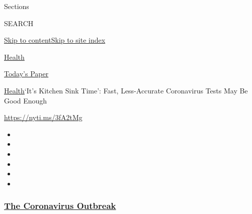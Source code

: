 Sections

SEARCH

\protect\hyperlink{site-content}{Skip to
content}\protect\hyperlink{site-index}{Skip to site index}

\href{https://www.nytimes3xbfgragh.onion/section/health}{Health}

\href{https://myaccount.nytimes3xbfgragh.onion/auth/login?response_type=cookie\&client_id=vi}{}

\href{https://www.nytimes3xbfgragh.onion/section/todayspaper}{Today's
Paper}

\href{/section/health}{Health}\textbar{}`It's Kitchen Sink Time': Fast,
Less-Accurate Coronavirus Tests May Be Good Enough

\url{https://nyti.ms/3fA2tMg}

\begin{itemize}
\item
\item
\item
\item
\item
\item
\end{itemize}

\hypertarget{the-coronavirus-outbreak}{%
\subsubsection{\texorpdfstring{\href{https://www.nytimes3xbfgragh.onion/news-event/coronavirus?name=styln-coronavirus-national\&region=TOP_BANNER\&block=storyline_menu_recirc\&action=click\&pgtype=Article\&impression_id=372474b0-f4b7-11ea-8a5e-83a68a0b9550\&variant=undefined}{The
Coronavirus
Outbreak}}{The Coronavirus Outbreak}}\label{the-coronavirus-outbreak}}

